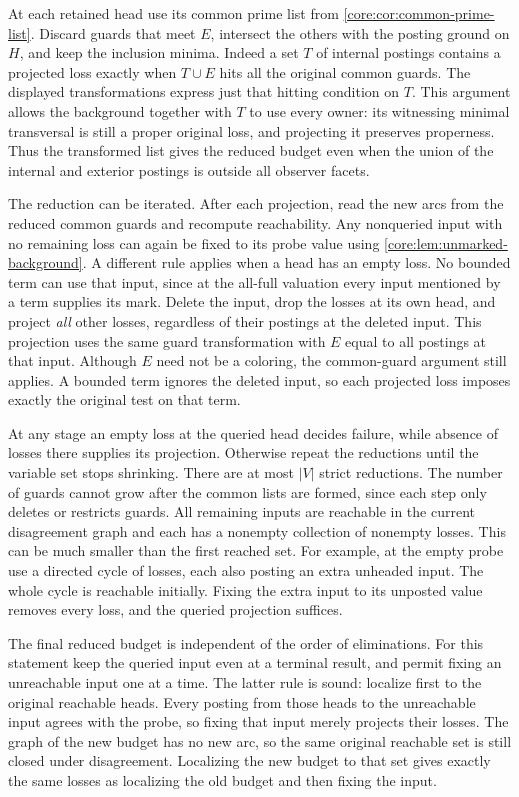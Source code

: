 At each retained head use its common prime list from
\cref{core:cor:common-prime-list}. Discard guards that
meet $E$, intersect the others with the posting ground
on $H$, and keep the inclusion minima. Indeed a set
$T$ of internal postings contains a projected loss
exactly when $T\cup E$ hits all the original common
guards. The displayed transformations express just
that hitting condition on $T$. This argument allows
the background together with $T$ to use every owner:
its witnessing minimal transversal is still a proper
original loss, and projecting it preserves properness.
Thus the transformed list gives the reduced budget
even when the union of the internal and exterior
postings is outside all observer facets.

The reduction can be iterated. After each projection,
read the new arcs from the reduced common guards and
recompute reachability. Any nonqueried input with no
remaining loss can again be fixed to its probe value
using \cref{core:lem:unmarked-background}. A different
rule applies when a head has an empty loss. No bounded
term can use that input, since at the all-full valuation
every input mentioned by a term supplies its mark.
Delete the input, drop the losses at its own head,
and project \emph{all} other losses, regardless of their
postings at the deleted input. This projection uses
the same guard transformation with $E$ equal to all
postings at that input. Although $E$ need not be a
coloring, the common-guard argument still applies.
A bounded term ignores the deleted input, so each
projected loss imposes exactly the original test
on that term.

At any stage an empty loss at the queried head decides
failure, while absence of losses there supplies its
projection. Otherwise repeat the reductions until the
variable set stops shrinking. There are at most $|V|$
strict reductions. The number of guards cannot grow
after the common lists are formed, since each step
only deletes or restricts guards. All remaining
inputs are reachable in the current disagreement graph
and each has a nonempty collection of nonempty losses.
This can be much smaller than the first reached set.
For example, at the empty probe use a directed cycle
of losses, each also posting an extra unheaded input.
The whole cycle is reachable initially. Fixing the
extra input to its unposted value removes every loss,
and the queried projection suffices.

The final reduced budget is independent of the order
of eliminations. For this statement keep the queried
input even at a terminal result, and permit fixing an
unreachable input one at a time. The latter rule is
sound: localize first to the original reachable heads.
Every posting from those heads to the unreachable input
agrees with the probe, so fixing that input merely
projects their losses. The graph of the new budget
has no new arc, so the same original reachable set
is still closed under disagreement. Localizing the
new budget to that set gives exactly the same losses
as localizing the old budget and then fixing the input.

